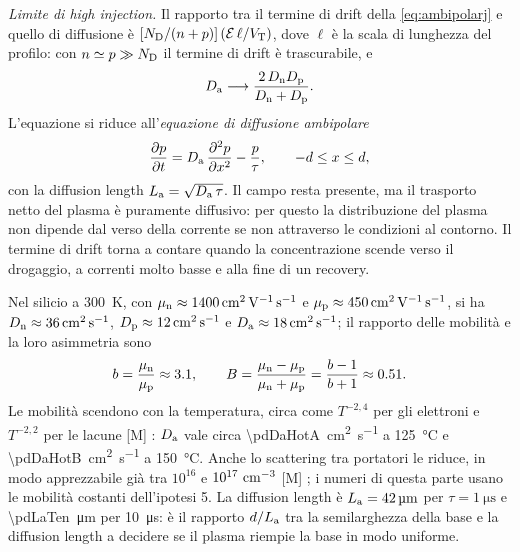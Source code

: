 \documentclass[10pt,a4paper]{scrartcl}
\let\newcommand\pdvaluedefine
\newcommand{\VT}{V_\mathrm{T}}
\newcommand{\Ef}{\mathcal{E}}                 %
\newcommand{\ND}{N_\mathrm{D}}
\newcommand{\Da}{D_\mathrm{a}}
\newcommand{\La}{L_\mathrm{a}}
\newcommand{\Dn}{D_\mathrm{n}}
\newcommand{\Dp}{D_\mathrm{p}}
\newcommand{\mun}{\mu_\mathrm{n}}
\newcommand{\mup}{\mu_\mathrm{p}}
\newcommand{\cmc}{\si{\centi\metre^{-3}}}
\newcommand{\dpar}[2]{\frac{\partial #1}{\partial #2}}
\newcommand{\dparq}[2]{\frac{\partial^2 #1}{\partial #2^2}}
\begin{document}
\emph{Limite di high injection.} Il rapporto tra il termine di drift della \eqref{eq:ambipolarj} e quello di diffusione è $[\ND/(n+p)]\,(\Ef\,\ell/\VT)$, dove $\ell$ è la scala di lunghezza del profilo: con $n \simeq p \gg \ND$ il termine di drift è trascurabile, e
\begin{equation}
\Da \longrightarrow \frac{2\,\Dn\Dp}{\Dn + \Dp} .
\label{eq:da}
\end{equation}
L'equazione si riduce all'\emph{equazione di diffusione ambipolare}
\begin{equation}
\dpar{p}{t} = \Da\,\dparq{p}{x} - \frac{p}{\tau} , \qquad -d \leq x \leq d ,
\label{eq:diffusion}
\end{equation}
con la diffusion length $\La = \sqrt{\Da\,\tau}$. Il campo resta presente, ma il trasporto netto del plasma è puramente diffusivo: per questo la distribuzione del plasma non dipende dal verso della corrente se non attraverso le condizioni al contorno. Il termine di drift torna a contare quando la concentrazione scende verso il drogaggio, a correnti molto basse e alla fine di un recovery.

Nel silicio a \SI{300}{\kelvin}, con $\mun \approx \SI{\pdMun}{\centi\metre\squared\per\volt\per\second}$ e $\mup \approx \SI{\pdMup}{\centi\metre\squared\per\volt\per\second}$, si ha $\Dn \approx \SI{\pdDn}{\centi\metre\squared\per\second}$, $\Dp \approx \SI{\pdDp}{\centi\metre\squared\per\second}$ e $\Da \approx \SI{\pdDa}{\centi\metre\squared\per\second}$; il rapporto delle mobilità e la loro asimmetria sono
\begin{equation}
b = \frac{\mun}{\mup} \approx \pdBratio , \qquad B = \frac{\mun - \mup}{\mun + \mup} = \frac{b-1}{b+1} \approx \pdBmob .
\label{eq:bdef}
\end{equation}
Le mobilità scendono con la temperatura, circa come $T^{-2,4}$ per gli elettroni e $T^{-2,2}$ per le lacune [M] \cite{sze}: $\Da$ vale circa \SI{\pdDaHotA}{\centi\metre\squared\per\second} a \SI{125}{\celsius} e \SI{\pdDaHotB}{\centi\metre\squared\per\second} a \SI{150}{\celsius}. Anche lo scattering tra portatori le riduce, in modo apprezzabile già tra $10^{16}$ e $10^{17}\ \cmc$ [M] \cite{lutz}; i numeri di questa parte usano le mobilità costanti dell'ipotesi 5. La diffusion length è $\La = \SI{\pdLaOne}{\micro\metre}$ per $\tau = \SI{1}{\micro\second}$ e \SI{\pdLaTen}{\micro\metre} per \SI{10}{\micro\second}: è il rapporto $d/\La$ tra la semilarghezza della base e la diffusion length a decidere se il plasma riempie la base in modo uniforme.
\end{document}
